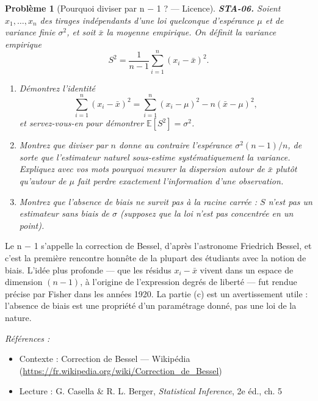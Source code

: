 \documentclass[11pt]{article}
\newtheorem{problem}{Problème}
\newenvironment{refs}{\par\small\noindent\emph{Références :}\begin{itemize}\setlength\itemsep{0pt}}{\end{itemize}\normalsize}
\begin{document}
\bigskip

\begin{problem}[{Pourquoi diviser par n $-$ 1 ? --- Licence}]
\textbf{STA-06.} Soient $ x_1, \dots, x_n $ des tirages indépendants d'une loi quelconque
d'espérance $ \mu $ et de variance finie $ \sigma^2 $, et soit $ \bar{x} $ la moyenne
empirique. On définit la variance empirique
\[ S^2 = \frac{1}{n-1} \sum_{i=1}^{n} (x_i - \bar{x})^2 . \]
\begin{enumerate}
\item[(a)] Démontrez l'identité
\[ \sum_{i=1}^{n} (x_i - \bar{x})^2 = \sum_{i=1}^{n} (x_i - \mu)^2 - n(\bar{x} - \mu)^2 , \]
et servez-vous-en pour démontrer $ \mathbb{E}[S^2] = \sigma^2 $.
\item[(b)] Montrez que diviser par $ n $ donne au contraire l'espérance $ \sigma^2 (n-1)/n $, de sorte
que l'estimateur \og{} naturel \fg{} sous-estime systématiquement la variance. Expliquez avec vos mots
pourquoi mesurer la dispersion autour de $ \bar{x} $ plutôt qu'autour de $ \mu $ fait perdre
exactement l'information d'une observation.
\item[(c)] Montrez que l'absence de biais ne survit pas à la racine carrée : $ S $ n'est \textit{pas} un
estimateur sans biais de $ \sigma $ (supposez que la loi n'est pas concentrée en un point).
\end{enumerate}

\end{problem}

\noindent Le n $-$ 1 s'appelle la correction de Bessel, d'après l'astronome Friedrich
Bessel, et c'est la première rencontre honnête de la plupart des étudiants avec la notion de biais.
L'idée plus profonde --- que les résidus $ x_i - \bar{x} $ vivent dans un espace de dimension
$ (n-1) $, à l'origine de l'expression \og{} degrés de liberté \fg{} --- fut rendue précise par Fisher dans
les années 1920. La partie (c) est un avertissement utile : l'absence de biais est une propriété
d'un paramétrage donné, pas une loi de la nature.

\begin{refs}
\item Contexte : Correction de Bessel --- Wikipédia (\url{https://fr.wikipedia.org/wiki/Correction_de_Bessel})
\item Lecture : G. Casella \& R. L. Berger, \textit{Statistical Inference}, 2e éd., ch. 5
\end{refs}

\bigskip
\end{document}
